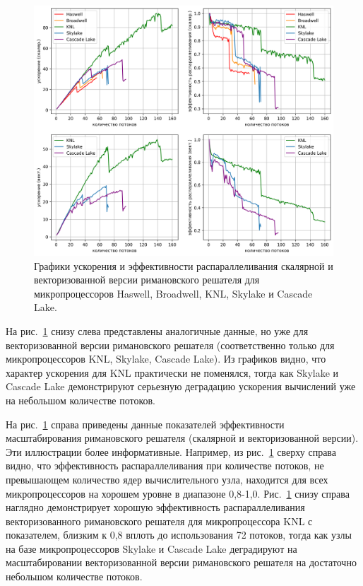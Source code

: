 \begin{figure}[ht]
\centering
\includegraphics[width=1.0\textwidth]{./pics/text_3_omp2/main_chart.png}
\singlespacing
{}\caption{Графики ускорения и эффективности распараллеливания скалярной и векторизованной версии римановского решателя для микропроцессоров Haswell, Broadwell, KNL, Skylake и Cascade Lake.}
\label{fig:text_3_omp2}
\end{figure}

На рис.~\ref{fig:text_3_omp2} снизу слева представлены аналогичные данные, но уже для векторизованной версии римановского решателя (соответственно только для микропроцессоров KNL, Skylake, Cascade Lake).
Из графиков видно, что характер ускорения для KNL практически не поменялся, тогда как Skylake и Cascade Lake демонстрируют серьезную деградацию ускорения вычислений уже на небольшом количестве потоков.

На рис.~\ref{fig:text_3_omp2} справа приведены данные показателей эффективности масштабирования римановского решателя (скалярной и векторизованной версии).
Эти иллюстрации более информативные.
Например, из рис.~\ref{fig:text_3_omp2} сверху справа видно, что эффективность распараллеливания при количестве потоков, не превышающем количество ядер вычислительного узла, находится для всех микропроцессоров на хорошем уровне в диапазоне 0,8-1,0.
Рис.~\ref{fig:text_3_omp2} снизу справа наглядно демонстрирует хорошую эффективность распараллеливания векторизованного римановского решателя для микропроцессора KNL с показателем, близким к 0,8 вплоть до использования 72 потоков, тогда как узлы на базе микропроцессоров Skylake и Cascade Lake деградируют на масштабировании векторизованной версии римановского решателя на достаточно небольшом количестве потоков.

